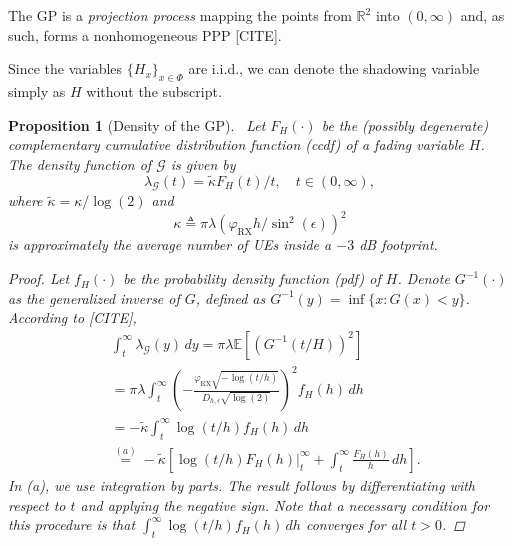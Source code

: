 \documentclass[lettersize,journal]{IEEEtran}
\newtheorem{prop}[theorem]{Proposition}
\begin{document}
The GP is a \textit{projection process} mapping the points from $\mathbb{R}^2$ into $(0,\infty)$ and, as such, forms a nonhomogeneous PPP [CITE].



Since the variables $\{H_x\}_{x \in \Phi}$ are i.i.d., we can denote the shadowing variable simply as $H$ without the subscript.
\begin{prop}[Density of the GP]\
  Let $F_H(\cdot)$ be the (possibly degenerate) complementary cumulative distribution function (ccdf) of a fading variable $H$. The density function of $\mathcal{G}$ is given by
  \begin{equation}
    \label{eq:GPdensity}
    \lambda_{\mathcal{G}}(t) = \tilde{\kappa} {F_H(t)}/{t}, \quad t \in (0, \infty),
  \end{equation}
  where $\tilde{\kappa} = {\kappa}/{\log(2)}$ and
  \begin{equation}\kappa \triangleq \pi \lambda \left({\varphi_{\text{RX}}}h/{\sin^2(\epsilon)}\right)^2
    \label{eq:kappa}
  \end{equation}
  is approximately the average number of UEs inside a $-3$ dB footprint.

  
  \begin{proof}
    Let $f_H(\cdot)$ be the probability density function (pdf) of $H$. Denote $G^{-1}(\cdot)$ as the generalized inverse of $G$, defined as $G^{-1}(y) = \inf \{x : G(x) < y\}$. According to [CITE],
    \begin{align*}
      &\int_t^{\infty} \lambda_{\mathcal{G}}(y) \, dy = \pi \lambda \mathbb{E}\left[ \left({G^{-1}(t/H)}{}\right)^2 \right] \\
      &= \pi \lambda \int_t^{\infty} \left(-\frac{\varphi_{\text{RX}} \sqrt{-\log(t/h)}}{D_{h,\epsilon} \sqrt{\log(2)}}\right)^2 f_H(h) \, dh \\
      &= -\tilde{\kappa} \int_t^{\infty} \log(t/h) f_H(h) \, dh \\
      &\overset{(a)}{=} -\tilde{\kappa} \left[ \left. \log(t/h) F_H(h) \right|_t^{\infty} + \int_t^{\infty} \frac{F_H(h)}{h} \, dh \right].
    \end{align*}
    In (a), we use integration by parts. The result follows by differentiating with respect to $t$ and applying the negative sign. Note that a necessary condition for this procedure is that $\int_t^{\infty} \log(t/h) f_H(h) \, dh$ converges for all $t > 0$.
  \end{proof}
\end{prop}
\end{document}
